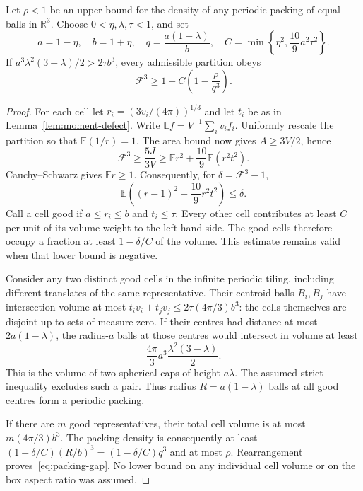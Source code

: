 \documentclass[11pt,a4paper]{report}
\newcommand{\DF}{\mathcal F}
\begin{document}
\enlargethispage{\baselineskip}
\begin{lemma}\label{lem:packing-gap}
Let $\rho<1$ be an upper bound for the density of any periodic packing of
equal balls in $\mathbb R^3$. Choose $0<\eta,\lambda,\tau<1$, and set
\[
 a=1-\eta,\quad b=1+\eta,\quad
 q=\frac{a(1-\lambda)}b,\quad
 C=\min\left\{\eta^2,\frac{10}{9}a^2\tau^2\right\}.
\]
If $a^3\lambda^2(3-\lambda)/2>2\tau b^3$, every admissible partition obeys
\begin{equation}\label{eq:packing-gap}
 \DF^3\geq 1+C\left(1-\frac{\rho}{q^3}\right).
\end{equation}
\end{lemma}
\begin{proof}
For each cell let $r_i=(3v_i/(4\pi))^{1/3}$ and let $t_i$ be as in
Lemma~\ref{lem:moment-defect}. Write
$\mathbb E f=V^{-1}\sum_i v_i f_i$. Uniformly rescale the partition so that
$\mathbb E(1/r)=1$. The area bound now gives $A\geq3V/2$, hence
\[
 \DF^3\geq\frac{5J}{3V}
 \geq\mathbb E r^2+\frac{10}{9}\mathbb E(r^2t^2).
\]
Cauchy--Schwarz gives $\mathbb E r\geq1$. Consequently, for
$\delta=\DF^3-1$,
\begin{equation}\label{eq:defect-budget}
 \mathbb E\left((r-1)^2+\frac{10}{9}r^2t^2\right)\leq\delta.
\end{equation}
Call a cell good if $a\leq r_i\leq b$ and $t_i\leq\tau$.
Every other cell contributes at least $C$ per unit of its volume weight
to the left-hand side. The good cells therefore occupy a fraction at
least $1-\delta/C$ of the volume. This estimate remains valid when that
lower bound is negative.

Consider any two distinct good cells in the infinite periodic tiling,
including different translates of the same representative. Their
centroid balls $B_i,B_j$ have intersection volume at most
$t_iv_i+t_jv_j\leq2\tau(4\pi/3)b^3$: the cells themselves are disjoint
up to sets of measure zero. If their centres had distance at most
$2a(1-\lambda)$, the radius-$a$ balls at those centres would intersect in
volume at least
\[
 \frac{4\pi}{3}a^3\frac{\lambda^2(3-\lambda)}2.
\]
This is the volume of two spherical caps of height $a\lambda$.
The assumed strict inequality excludes such a pair. Thus radius
$R=a(1-\lambda)$ balls at all good centres form a periodic packing.

If there are $m$ good representatives, their total cell volume is at
most $m(4\pi/3)b^3$. The packing density is consequently at least
$(1-\delta/C)(R/b)^3=(1-\delta/C)q^3$ and at most $\rho$.
Rearrangement proves~\eqref{eq:packing-gap}. No lower bound on any
individual cell volume or on the box aspect ratio was assumed.
\end{proof}
\end{document}
